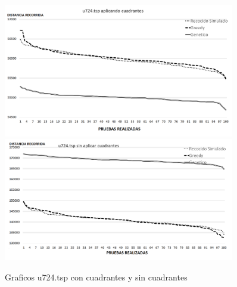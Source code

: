  \begin{figure}[hbtp]
    \centering
        \includegraphics[width=0.9\textwidth]{PruebasResultados/Experimentos_Graficos_Con/u724.png}
        \includegraphics[width=0.9\textwidth]{PruebasResultados/Experimentos_Graficos_Sin/u724.png}
        \caption{Graficos u724.tsp con cuadrantes y sin cuadrantes}
        \label{fig:u724_grafica.png}
\end{figure}
\newpage

